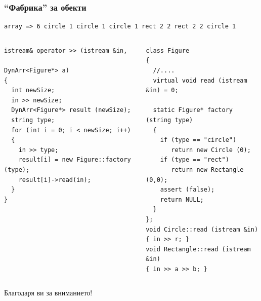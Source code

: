 \documentclass{beamer}
\begin{document}
\begin{frame}[fragile]
\frametitle{``Фабрика'' за обекти}



\begin{flushleft}
\begin{lstlisting}
array => 6 circle 1 circle 1 circle 1 rect 2 2 rect 2 2 circle 1 
\end{lstlisting}  
\end{flushleft}

\begin{columns}[t]
  \begin{column}{0.5\textwidth}
\begin{flushleft}
\begin{lstlisting}
istream& operator >> (istream &in, 
                      DynArr<Figure*> a)
{
  int newSize; 
  in >> newSize; 
  DynArr<Figure*> result (newSize);
  string type;
  for (int i = 0; i < newSize; i++)
  {
    in >> type;
    result[i] = new Figure::factory (type); 
    result[i]->read(in);
  }
}
\end{lstlisting}  
\end{flushleft}
  \end{column}
  \begin{column}{0.5\textwidth}
\begin{flushleft}
\begin{lstlisting}
class Figure
{
  //....
  virtual void read (istream &in) = 0;
  
  static Figure* factory (string type)
  {
    if (type == "circle") 
       return new Circle (0);
    if (type == "rect") 
       return new Rectangle (0,0);
    assert (false);
    return NULL;
  }
};
void Circle::read (istream &in)
{ in >> r; }
void Rectangle::read (istream &in)
{ in >> a >> b; }
\end{lstlisting}  
\end{flushleft}

  \end{column}
\end{columns}


\end{frame}


\begin{frame}
\centerline{Благодаря ви за вниманието!}
\end{frame}
\end{document}
